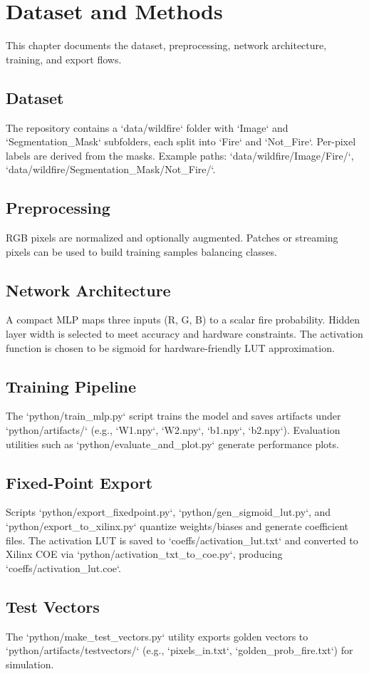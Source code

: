 \chapter{Dataset and Methods}\label{chap:dataset-methods}
This chapter documents the dataset, preprocessing, network architecture, training, and export flows.

\section{Dataset}
The repository contains a `data/wildfire` folder with `Image` and `Segmentation\_Mask` subfolders, each split into `Fire` and `Not\_Fire`. Per-pixel labels are derived from the masks. Example paths: `data/wildfire/Image/Fire/`, `data/wildfire/Segmentation_Mask/Not_Fire/`.

\section{Preprocessing}
RGB pixels are normalized and optionally augmented. Patches or streaming pixels can be used to build training samples balancing classes.

\section{Network Architecture}
A compact MLP maps three inputs (R, G, B) to a scalar fire probability. Hidden layer width is selected to meet accuracy and hardware constraints. The activation function is chosen to be sigmoid for hardware-friendly LUT approximation.

\section{Training Pipeline}
The `python/train_mlp.py` script trains the model and saves artifacts under `python/artifacts/` (e.g., `W1.npy`, `W2.npy`, `b1.npy`, `b2.npy`). Evaluation utilities such as `python/evaluate_and_plot.py` generate performance plots.

\section{Fixed-Point Export}
Scripts `python/export_fixedpoint.py`, `python/gen_sigmoid_lut.py`, and `python/export_to_xilinx.py` quantize weights/biases and generate coefficient files. The activation LUT is saved to `coeffs/activation_lut.txt` and converted to Xilinx COE via `python/activation_txt_to_coe.py`, producing `coeffs/activation_lut.coe`.

\section{Test Vectors}
The `python/make_test_vectors.py` utility exports golden vectors to `python/artifacts/testvectors/` (e.g., `pixels_in.txt`, `golden_prob_fire.txt`) for simulation.
